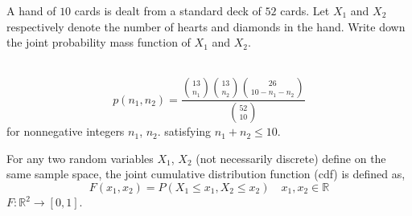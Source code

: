 \begin{example}
A hand of $10$ cards is dealt from a standard deck of $52$ cards. Let $X_1$ and
$X_2$ respectively denote the number of hearts and diamonds in the hand. Write
down the joint probability mass function of $X_1$ and $X_2$.
\begin{solution}\quad                                                        \\
\[
    p(n_1, n_2) = \frac{{13 \choose n_1} {13 \choose n_2} {26 \choose {10
                  - n_1 - n_2}}} {{52 \choose 10}}
\]
for nonnegative integers $n_1$, $n_2$. satisfying $n_1 + n_2 \leq 10$.
\end{solution}
\end{example}

\begin{definition}
For any two random variables $X_1$, $X_2$ (not necessarily discrete) define on
the same sample space, the joint cumulative distribution function (cdf) is
defined as,
\[
    F(x_1, x_2) = P(X_1 \leq x_1, X_2 \leq x_2) \quad x_1, x_2 \in \mathbb{R}
\]
\note $F : \mathbb{R}^2 \rightarrow [0, 1]$.
\end{definition}

